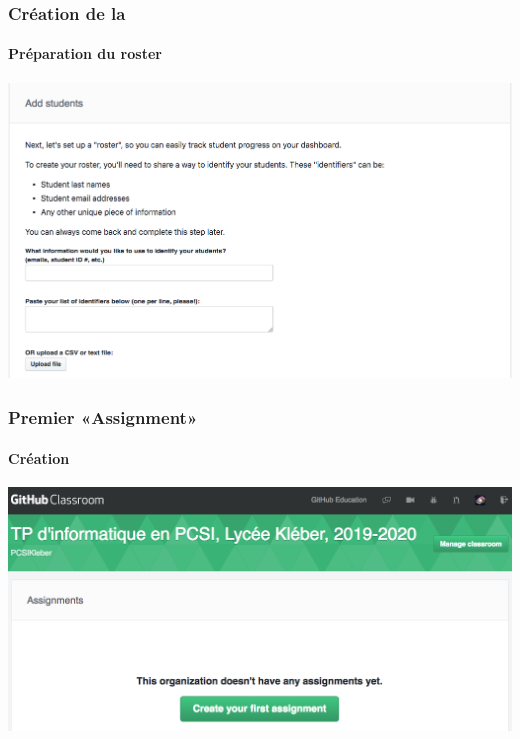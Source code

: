 \begin{frame}
	\frametitle{Création de la }
	\framesubtitle{Préparation du roster}


	\begin{center}
		\includegraphics[width=\linewidth]{figures/classroom_roster.png}
	\end{center}

\end{frame}

\begin{frame}
	\frametitle{Premier «Assignment»}
	\framesubtitle{Création}


	\begin{center}
		\includegraphics[width=\linewidth]{figures/classroom_assignment_creation.png}
	\end{center}

\end{frame}

